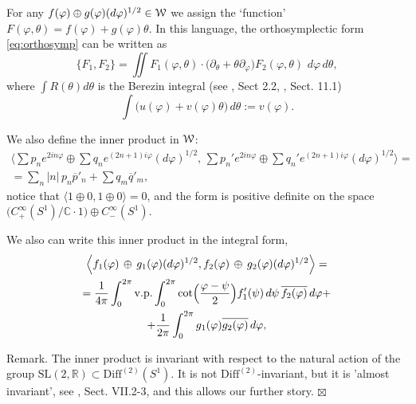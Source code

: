 \documentclass[]{amsart}
\def\SL{\mathrm {SL}}
\def\phi{\varphi}
\def\la{\langle}
\def\ra{\rangle}
\def\cW{\EuScript W}
\def\R {{\mathbb R }}
\def\C {{\mathbb C }}
\def\ov{\overline}
\def\sm{\smallskip}
\def\Diff{\mathrm{Diff}}
\begin{document}
\sm 

For any $f(\phi)\oplus g(\phi)(d\phi)^{1/2}\in \cW$ we assign the `function' $F(\phi,\theta)=f(\phi)+g(\phi)\theta$.
In this language, the orthosymplectic form \eqref{eq:orthosymp}  can be written as
$$
\{F_1,F_2\}=\iint F_1(\phi,\theta)\cdot \bigl(\partial_\theta+\theta\partial_\phi\bigr) F_2(\phi,\theta)\,
\,d\phi\,d\theta,
$$
where $\int R(\theta)d\theta$ is the Berezin integral
(see \cite{Ber-super}, Sect 2.2, \cite{Rog}, Sect. 11.1)
$$
\int  \bigl(u(\phi)+v(\phi)\theta)\,d\theta:=v(\phi).
$$




We also define the inner product in $\cW$:
\begin{multline}
\bigl\la
\sum p_n e^{2in\phi}\oplus \sum q_n e^{(2n+1)i\phi} (d\phi)^{1/2},\,
\sum p_n' e^{2in\phi}\oplus \sum q_n' e^{(2n+1)i\phi} (d\phi)^{1/2}
\bigr\ra
=\\=
\sum_n |n|\, p_n \ov p'_{n} +\sum q_m \ov q'_{m},
\label{eq:inner}
\end{multline}
notice that $\la 1\oplus 0,1\oplus 0\ra=0$, and the form
is positive definite on the space $\bigl(C^\infty_+(S^1)/\C\cdot 1\bigr)
\oplus C^\infty_-(S^1)$. 

We also can write this inner product in the integral form,
\begin{multline}
\Bigl\la  f_1(\phi)\,\oplus\, g_1(\phi) (d\phi)^{1/2},
 f_2(\phi)\,\oplus\, g_2(\phi) (d\phi)^{1/2}
\Bigr\ra
=\\=
\frac 1{4\pi}\int_0^{2\pi} \mathrm {v.p.} \int_0^{2\pi} 
\cot\Bigl(\frac{\phi-\psi}2\Bigr) f'_1(\psi)\,d\psi\, \ov {f_2(\phi)} \,d\phi+\\
+\frac 1{2\pi}\int_0^{2\pi} g_1(\phi)\ov{g_2(\phi)}\,d\phi,
\label{eq:inner-2}
\end{multline}

{\sc Remark.} The inner product is invariant with respect 
to the natural action of the group $\SL(2,\R)\subset \Diff^{(2)}(S^1)$.
It is not $\Diff^{(2)}$-invariant, but it is 'almost invariant', see
\cite{Ner-book}, Sect. VII.2-3, and this allows our further story.
\hfill $\boxtimes$



\sm
\end{document}
